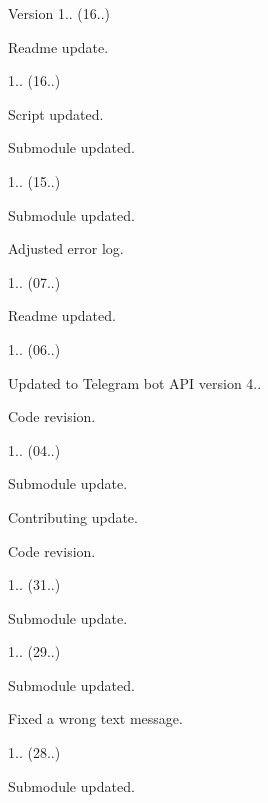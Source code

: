 \begin{DoxyVersion}{Version}
1.. (16..)
\begin{DoxyItemize}
\item Readme update. 
\end{DoxyItemize}

1.. (16..)
\begin{DoxyItemize}
\item Script updated.
\item Submodule updated. 
\end{DoxyItemize}

1.. (15..)
\begin{DoxyItemize}
\item Submodule updated.
\item Adjusted error log. 
\end{DoxyItemize}

1.. (07..)
\begin{DoxyItemize}
\item Readme updated. 
\end{DoxyItemize}

1.. (06..)
\begin{DoxyItemize}
\item Updated to Telegram bot A\+PI version 4..
\item Code revision. 
\end{DoxyItemize}

1.. (04..)
\begin{DoxyItemize}
\item Submodule update.
\item Contributing update.
\item Code revision. 
\end{DoxyItemize}

1.. (31..)
\begin{DoxyItemize}
\item Submodule update. 
\end{DoxyItemize}

1.. (29..)
\begin{DoxyItemize}
\item Submodule updated.
\item Fixed a wrong text message. 
\end{DoxyItemize}

1.. (28..)
\begin{DoxyItemize}
\item Submodule updated. 
\end{DoxyItemize}


\end{DoxyVersion}

